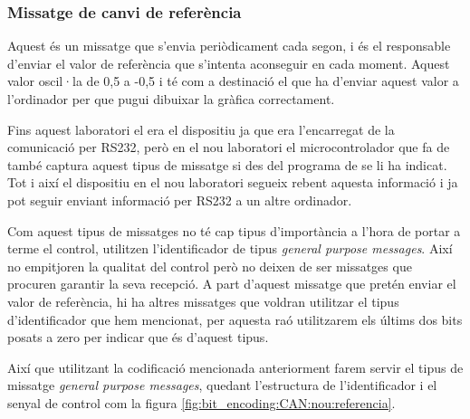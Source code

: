 \subsubsection{Missatge de canvi de referència}\label{cap:dis:CAN:nou:referencia}

Aquest és un missatge que s'envia periòdicament cada segon, i és el responsable d'enviar el valor de referència que s'intenta aconseguir en cada moment. Aquest valor oscil·la de 0,5 a -0,5 i té com a destinació el \Supervisor que ha d'enviar aquest valor a l'ordinador per que pugui dibuixar la gràfica correctament.

Fins aquest laboratori el \Supervisor era el dispositiu \SensorActuador ja que era l'encarregat de la comunicació per RS232, però en el nou laboratori el microcontrolador que fa de \Monitor també captura aquest tipus de missatge si des del programa de \DCSMonitor se li ha indicat. Tot i així el dispositiu \SensorActuador en el nou laboratori segueix rebent aquesta informació i ja pot seguir enviant informació per RS232 a un altre ordinador.

Com aquest tipus de missatges no té cap tipus d'importància a l'hora de portar a terme el control, utilitzen l'identificador de tipus \emph{general purpose messages}. Així no empitjoren la qualitat del control però no deixen de ser missatges que procuren garantir la seva recepció. A part d'aquest missatge que pretén enviar el valor de referència, hi ha altres missatges que voldran utilitzar el tipus d'identificador que hem mencionat, per aquesta raó utilitzarem els últims dos bits posats a zero per indicar que és d'aquest tipus.

Així que utilitzant la codificació mencionada anteriorment farem servir el tipus de missatge \emph{general purpose messages}, quedant l'estructura de l'identificador i el senyal de control com la figura \ref{fig:bit_encoding:CAN:nou:referencia}.

